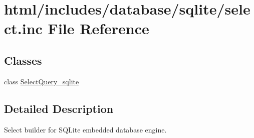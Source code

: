 \hypertarget{sqlite_2select_8inc}{
\section{html/includes/database/sqlite/select.inc File Reference}
\label{sqlite_2select_8inc}
}
\subsection*{Classes}
\begin{DoxyCompactItemize}
\item 
class \hyperlink{classSelectQuery__sqlite}{SelectQuery\_\-sqlite}
\end{DoxyCompactItemize}


\subsection{Detailed Description}
Select builder for SQLite embedded database engine. 